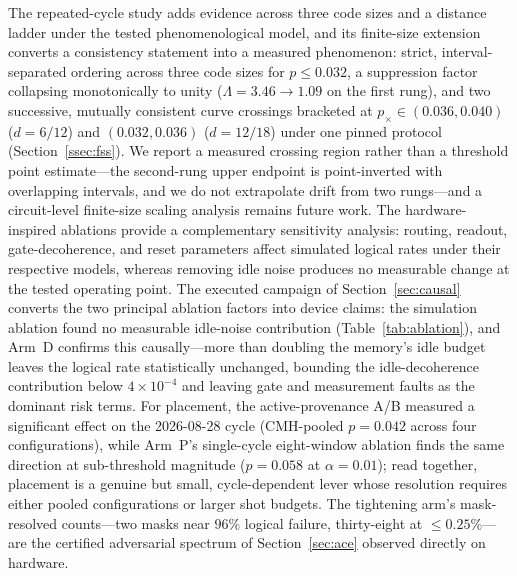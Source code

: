 \documentclass[pdflatex,sn-mathphys-num]{sn-jnl}
\theoremstyle{thmstyleone}
\theoremstyle{thmstyletwo}
\theoremstyle{thmstylethree}
\begin{document}
The repeated-cycle study adds evidence across three code sizes and a distance ladder under the tested phenomenological model, and its finite-size extension converts a consistency statement into a measured phenomenon: strict, interval-separated ordering across three code sizes for $p\le0.032$, a suppression factor collapsing monotonically to unity ($\Lambda=3.46\to1.09$ on the first rung), and two successive, mutually consistent curve crossings bracketed at $p_{\times}\in(0.036,0.040)$ ($d{=}6/12$) and $(0.032,0.036)$ ($d{=}12/18$) under one pinned protocol (Section~\ref{ssec:fss}). We report a measured crossing region rather than a threshold point estimate---the second-rung upper endpoint is point-inverted with overlapping intervals, and we do not extrapolate drift from two rungs---and a circuit-level finite-size scaling analysis remains future work. The hardware-inspired ablations provide a complementary sensitivity analysis: routing, readout, gate-decoherence, and reset parameters affect simulated logical rates under their respective models, whereas removing idle noise produces no measurable change at the tested operating point. The executed campaign of Section~\ref{sec:causal} converts the two principal ablation factors into device claims: the simulation ablation found no measurable idle-noise contribution (Table~\ref{tab:ablation}), and Arm~D confirms this causally---more than doubling the memory's idle budget leaves the logical rate statistically unchanged, bounding the idle-decoherence contribution below $4\times10^{-4}$ and leaving gate and measurement faults as the dominant risk terms. For placement, the active-provenance A/B measured a significant effect on the 2026-08-28 cycle (CMH-pooled $p=0.042$ across four configurations), while Arm~P's single-cycle eight-window ablation finds the same direction at sub-threshold magnitude ($p=0.058$ at $\alpha=0.01$); read together, placement is a genuine but small, cycle-dependent lever whose resolution requires either pooled configurations or larger shot budgets. The tightening arm's mask-resolved counts---two masks near $96\%$ logical failure, thirty-eight at $\le0.25\%$---are the certified adversarial spectrum of Section~\ref{sec:ace} observed directly on hardware.
\end{document}
